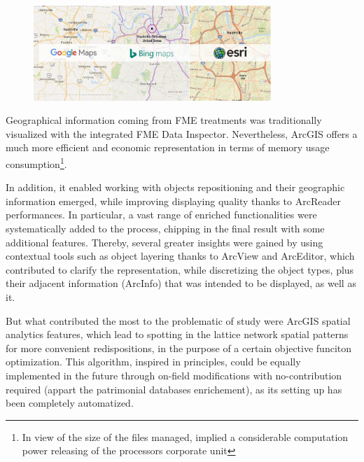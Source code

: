 \begin{figure}[h!]
    \centering
    \parbox[t]{0.8\textwidth}{
    \href{https://www.diatomenterprises.com/visual-data-representation-in-google-maps-bing-maps-or-esri-which-to-choose/}{\includegraphics[width=0.8\textwidth]{0.figuras/googlemaps_bingmaps_esri.jpg}}
    \label{fig:Googlemaps}}
\end{figure}

Geographical information coming from FME treatments was traditionally visualized with the integrated FME Data Inspector. Nevertheless, ArcGIS offers a much more efficient and economic representation in terms of memory usage consumption\footnote{In view of the size of the files managed, implied a considerable computation power releasing of the processors corporate unit}.

In addition, it enabled working with objects repositioning and their geographic information emerged, while improving displaying quality thanks to ArcReader performances. In particular, a vast range of enriched functionalities were systematically added to the process, chipping in the final result with some additional features. Thereby, several greater insights were gained by using contextual tools such as object layering thanks to ArcView and ArcEditor, which contributed to clarify the representation, while discretizing the object types, plus their adjacent information (ArcInfo) that was intended to be displayed, as well as it.

But what contributed the most to the problematic of study were ArcGIS spatial analytics features, which lead to spotting in the lattice network spatial patterns for more convenient redispositions, in the purpose of a certain objective funciton optimization. This algorithm, inspired in  principles, could be equally implemented in the future through on-field modifications with no-contribution  required (appart the patrimonial databases enrichement), as its setting up has been completely automatized.

